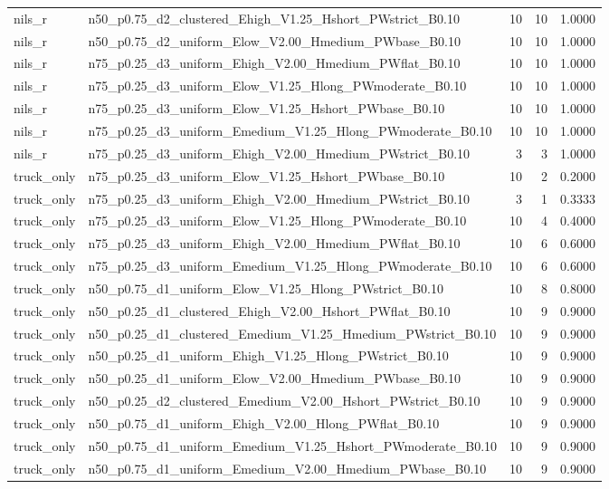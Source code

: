 \begin{tabular}{llrrr}
nils_r & n50_p0.75_d2_clustered_Ehigh_V1.25_Hshort_PWstrict_B0.10 & 10 & 10 & 1.0000 \\
nils_r & n50_p0.75_d2_uniform_Elow_V2.00_Hmedium_PWbase_B0.10 & 10 & 10 & 1.0000 \\
nils_r & n75_p0.25_d3_uniform_Ehigh_V2.00_Hmedium_PWflat_B0.10 & 10 & 10 & 1.0000 \\
nils_r & n75_p0.25_d3_uniform_Elow_V1.25_Hlong_PWmoderate_B0.10 & 10 & 10 & 1.0000 \\
nils_r & n75_p0.25_d3_uniform_Elow_V1.25_Hshort_PWbase_B0.10 & 10 & 10 & 1.0000 \\
nils_r & n75_p0.25_d3_uniform_Emedium_V1.25_Hlong_PWmoderate_B0.10 & 10 & 10 & 1.0000 \\
nils_r & n75_p0.25_d3_uniform_Ehigh_V2.00_Hmedium_PWstrict_B0.10 & 3 & 3 & 1.0000 \\
truck_only & n75_p0.25_d3_uniform_Elow_V1.25_Hshort_PWbase_B0.10 & 10 & 2 & 0.2000 \\
truck_only & n75_p0.25_d3_uniform_Ehigh_V2.00_Hmedium_PWstrict_B0.10 & 3 & 1 & 0.3333 \\
truck_only & n75_p0.25_d3_uniform_Elow_V1.25_Hlong_PWmoderate_B0.10 & 10 & 4 & 0.4000 \\
truck_only & n75_p0.25_d3_uniform_Ehigh_V2.00_Hmedium_PWflat_B0.10 & 10 & 6 & 0.6000 \\
truck_only & n75_p0.25_d3_uniform_Emedium_V1.25_Hlong_PWmoderate_B0.10 & 10 & 6 & 0.6000 \\
truck_only & n50_p0.75_d1_uniform_Elow_V1.25_Hlong_PWstrict_B0.10 & 10 & 8 & 0.8000 \\
truck_only & n50_p0.25_d1_clustered_Ehigh_V2.00_Hshort_PWflat_B0.10 & 10 & 9 & 0.9000 \\
truck_only & n50_p0.25_d1_clustered_Emedium_V1.25_Hmedium_PWstrict_B0.10 & 10 & 9 & 0.9000 \\
truck_only & n50_p0.25_d1_uniform_Ehigh_V1.25_Hlong_PWstrict_B0.10 & 10 & 9 & 0.9000 \\
truck_only & n50_p0.25_d1_uniform_Elow_V2.00_Hmedium_PWbase_B0.10 & 10 & 9 & 0.9000 \\
truck_only & n50_p0.25_d2_clustered_Emedium_V2.00_Hshort_PWstrict_B0.10 & 10 & 9 & 0.9000 \\
truck_only & n50_p0.75_d1_uniform_Ehigh_V2.00_Hlong_PWflat_B0.10 & 10 & 9 & 0.9000 \\
truck_only & n50_p0.75_d1_uniform_Emedium_V1.25_Hshort_PWmoderate_B0.10 & 10 & 9 & 0.9000 \\
truck_only & n50_p0.75_d1_uniform_Emedium_V2.00_Hmedium_PWbase_B0.10 & 10 & 9 & 0.9000 \\

\end{tabular}
